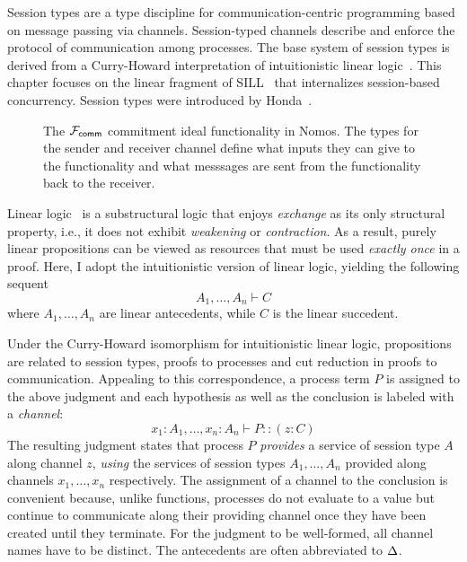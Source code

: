 Session types are a type discipline for communication-centric programming
based on message passing via channels. Session-typed channels describe and
enforce the protocol of communication among processes. The base system of
session types is derived from a Curry-Howard interpretation of intuitionistic
linear logic~\cite{CairesCONCUR2010}. This chapter focuses on the linear
fragment of SILL~\cite{PfenningFOSSACS2015} that internalizes session-based
concurrency.
Session types were introduced by Honda~\cite{HondaCONCUR1993}.

\begin{figure*}[!ht]

\caption{The $\mathcal{F}_{{\mathsf {comm}}}$ commitment ideal functionality in Nomos. The types for the sender and receiver channel define what inputs they can give to the functionality and what messsages are sent from the functionality back to the receiver.}
\label{fig:nomos:commitment}
\end{figure*}


Linear logic~\cite{GirardTCS1987} is a substructural logic that enjoys
\emph{exchange} as its only structural property, i.e., it does not exhibit
\emph{weakening} or \emph{contraction}. As a result, purely linear
propositions can be viewed as resources that must be used \emph{exactly
once} in a proof. Here, I adopt the intuitionistic version of linear logic,
yielding the following sequent
\[
A_1, \ldots, A_n \vdash C
\]
where $A_1, \ldots, A_n$ are linear antecedents, while $C$ is the linear
succedent.

Under the Curry-Howard isomorphism for intuitionistic linear logic,
propositions are related to session types, proofs to processes and cut
reduction in proofs to communication. Appealing to this correspondence,
a process term $P$ is assigned to the above judgment and each hypothesis
as well as the conclusion is labeled with a \emph{channel}:
\[
x_1 : A_1, \ldots, x_n : A_n \vdash P :: (z : C)
\]
The resulting judgment states that process $P$ \emph{provides} a service
of session type $A$ along channel $z$, \emph{using} the services of session
types $A_1, \ldots, A_n$ provided along channels $x_1, \ldots, x_n$
respectively. The assignment of a channel to the conclusion is convenient
because, unlike functions, processes do not evaluate to a value but continue
to communicate along their providing channel once they have been created
until they terminate. For the judgment to be well-formed, all channel names
have to be distinct. The antecedents are often abbreviated to $\Delta$.


